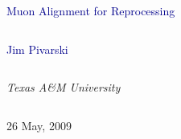 \documentclass[compress]{beamer}
\begin{document}
\begin{frame}
\vfill
\begin{center}
\textcolor{darkblue}{\Large Muon Alignment for Reprocessing}

\vfill
\begin{columns}
\begin{center}
\large
\textcolor{darkblue}{Jim Pivarski}
\end{center}
\end{columns}

\begin{columns}
\begin{center}
\scriptsize
{\it Texas A\&M University}
\end{center}
\end{columns}

\vfill
26 May, 2009

\end{center}
\end{frame}


\small
\end{document}
